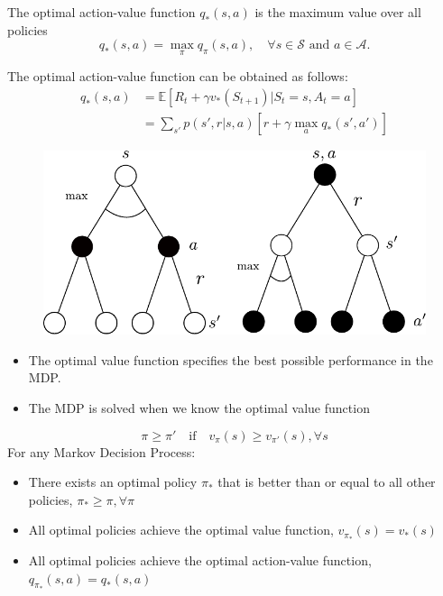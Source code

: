 \begin{definition}
	The optimal action-value function $q_{*}(s, a)$ is the maximum value over all policies
	$$q_{*}(s,a) = \max_{\pi} q_{\pi}(s,a), \quad \forall s\in \mathcal{S} \textrm{ and } a\in \mathcal{A}.$$
\end{definition}
The optimal action-value function can be obtained as follows:
\begin{align*}
	q_{*}(s,a) &= \mathbb{E}[R_{t}+\gamma v_*(S_{t+1})|S_t=s, A_t=a]\\ 
			   &= \sum_{s'}p(s',r|s,a)[r + \gamma \max_a q_*(s',a')]
\end{align*}
\begin{figure}[h]
	\centering
	\includegraphics[scale=0.5]{./images/optimal_action.pdf}
\end{figure}
\begin{itemize}
	\item The optimal value function specifies the best possible performance in the MDP.
	\item The MDP is solved when we know the optimal value function
\end{itemize}

\begin{theorem}
	$$\pi\geq \pi' \quad\textrm{if}\quad v_\pi(s) \geq v_{\pi'}(s), \forall s$$
	For any Markov Decision Process:
	\begin{itemize}
		\item There exists an optimal policy $\pi_*$ that is better than or equal to all other policies, $\pi_*\geq \pi, \forall \pi$
		\item All optimal policies achieve the optimal value function, $v_{\pi_*}(s) = v_*(s)$
		\item All optimal policies achieve the optimal action-value function, $q_{\pi_*}(s,a) = q_{*}(s,a)$
	\end{itemize}
\end{theorem}

